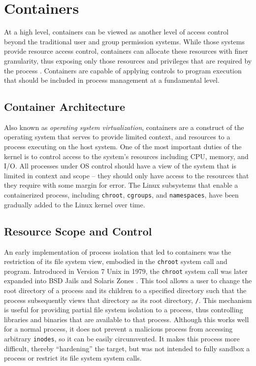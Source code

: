 \section{Containers}
\label{sec:containers}
At a high level, containers can be viewed as another level of access control beyond the traditional user and group permission systems. 
While those systems provide resource access control, containers can allocate these resources with finer granularity, thus exposing only those resources and privileges that are required by the process \autocite{_felter_1}. 
Containers are capable of applying controls to program execution that should be included in process management at a fundamental level.

\subsection{Container Architecture}
\label{sec:containerarchitecture}
Also known as \emph{operating system virtualization}, containers are a construct of the operating system that serves to provide limited context, and resources to a process executing on the host system. 
One of the most important duties of the kernel is to control access to the system's resources including CPU, memory, and I/O.  
All processes under OS control should have a view of the system that is limited in context and scope -- they should only have access to the resources that they require with some margin for error.  
The Linux subsystems that enable a containerized process, including \texttt{chroot}, \texttt{cgroups}, and \texttt{namespaces}, have been gradually added to the Linux kernel over time.

\subsection{Resource Scope and Control}
\label{sec:resource_scope_control}
An early implementation of process isolation that led to containers was the restriction of its file system view, embodied in the \texttt{chroot} system call and program. 
Introduced in Version 7 Unix in 1979, the \texttt{chroot} system call was later expanded into BSD Jails and Solaris Zones \autocite{_zones_1}.
This tool allows a user to change the root directory of a process and its children to a specified directory such that the process subsequently views that directory as its root directory, \texttt{/}.  
This mechanism is useful for providing partial file system isolation to a process, thus controlling libraries and binaries that are available to that process.
Although this works well for a normal process, it does not prevent a malicious process from accessing arbitrary \texttt{inodes}, so it can be easily circumvented.
It makes this process more difficult, thereby ``hardening'' the target, but was not intended to fully sandbox a process or restrict its file system system calls.

